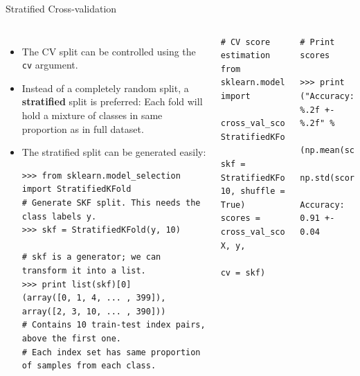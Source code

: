 \documentclass[10pt, aspectratio=169]{beamer} %
\begin{document}
\begin{frame}[fragile]{Stratified Cross-validation}
\begin{columns}
{\small\vspace*{-0.8cm}
\begin{itemize}
\item The CV split can be controlled using the \verb+cv+ argument.
\item Instead of a completely random split, a \textbf{stratified} split is preferred:
Each fold will hold a mixture of classes in same proportion as in full dataset.
\item The stratified split can be generated easily:
\begin{lstlisting}
>>> from sklearn.model_selection import StratifiedKFold
# Generate SKF split. This needs the class labels y.
>>> skf = StratifiedKFold(y, 10)

# skf is a generator; we can transform it into a list.
>>> print list(skf)[0]
(array([0, 1, 4, ... , 399]), array([2, 3, 10, ... , 390]))
# Contains 10 train-test index pairs, above the first one.
# Each index set has same proportion of samples from each class.
\end{lstlisting}

\end{itemize}
}
\begin{lstlisting}
# CV score estimation
from sklearn.model_selection import 
     cross_val_score, StratifiedKFold
		
skf = StratifiedKFold(y, 10, shuffle = True)
scores = cross_val_score(clf, X, y, 
                         cv = skf)
\end{lstlisting}
\begin{lstlisting}
# Print scores

>>> print ("Accuracy: %.2f +- %.2f" %
          (np.mean(scores), 
           np.std(scores)))

Accuracy: 0.91 +- 0.04
\end{lstlisting}
\end{columns}
\end{frame}
\end{document}
